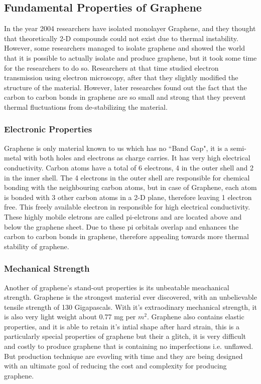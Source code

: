 \documentclass[conference]{IEEEtran}
\begin{document}
\subsection{\textbf{Fundamental Properties of Graphene}}
In the year 2004 researchers have isolated monolayer Graphene, and they thought that theoretically 2-D compounds could not exist due to thermal instability. However, some researchers managed to isolate graphene and showed the world that it is possible to actually isolate and produce graphene, but it took some time for the researchers to do so. Researchers at that time studied electron transmission using electron microscopy, after that they slightly modified the structure of the material. However, later researches found out the fact that the carbon to carbon bonds in graphene are so small and strong that they prevent thermal fluctuations from de-stabilizing the material.

\subsubsection{\textbf{Electronic Properties}}
Graphene is only material known to us which has no ``Band Gap", it is a semi-metal with both holes and electrons as charge carries. It has very high electrical conductivity. Carbon atoms have a total of 6 electrons, 4 in the outer shell and 2 in the inner shell. The 4 electrons in the outer shell are responsible for chemical bonding with the neighbouring carbon atoms, but in case of Graphene, each atom is bonded with 3 other carbon atoms in a 2-D plane, therefore leaving 1 electron free. This freely available electron in responsible for high electrical conductivity. These highly mobile eletrons are called pi-elctrons and are located above and below the graphene sheet. Due to these pi orbitals overlap and enhances the carbon to carbon bonds in graphene, therefore appealing towards more thermal stability of graphene.
\\

\subsubsection{\textbf{Mechanical Strength}}
Another of graphene’s stand-out properties is its unbeatable meachanical strength. Graphene is the strongest material ever discovered, with an unbelievable tensile strength of 130 Gigapascals. With it's extraodinary mechanical strength, it is also very light weight about 0.77 mg per $m^2$. Graphene also contains elastic properties, and it is able to retain it's intial shape after hard strain, this is a particularly special properties of graphene but their a glitch, it is very difficult and costly to produce graphene that is containing no imperfections i.e. unflawed. But production technique are evovling with time and they are being designed with an ultimate goal of reducing the cost and complexity for producing graphene.
\end{document}
